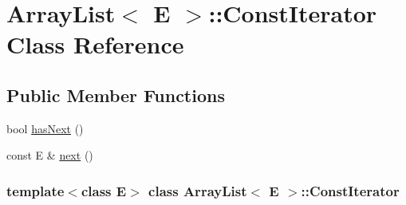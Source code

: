 \hypertarget{class_array_list_1_1_const_iterator}{
\section{ArrayList$<$ E $>$::ConstIterator Class Reference}
\label{class_array_list_1_1_const_iterator}
}
\subsection*{Public Member Functions}
\begin{DoxyCompactItemize}
\item 
bool \hyperlink{class_array_list_1_1_const_iterator_afdafa2e2b12abbef209f875d167a640a}{hasNext} ()
\item 
const E \& \hyperlink{class_array_list_1_1_const_iterator_ad6d3830785aa212e80978df1ad02c238}{next} ()
\end{DoxyCompactItemize}
\subsubsection*{template$<$class E$>$ class ArrayList$<$ E $>$::ConstIterator}



